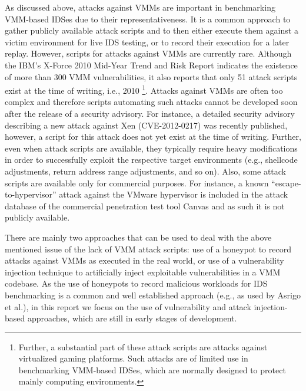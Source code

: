 As discussed above, attacks against VMMs are important in benchmarking VMM-based IDSes due to their representativeness. It is a common approach to gather publicly available attack scripts and to then either execute them against a victim environment for live IDS testing, or to record their execution for a later replay. However, scripts for attacks against VMMs are currently rare. Although the IBM's X-Force 2010 Mid-Year Trend and Risk Report indicates the existence of more than 300 VMM vulnerabilities, it also reports that only 51 attack scripts exist at the time of writing, i.e., 2010 \cite{ibm:midterm}\footnote{Further, a substantial part of these attack scripts are attacks against virtualized gaming platforms. Such attacks are of limited use in benchmarking VMM-based IDSes, which are normally designed to protect mainly computing environments.}. Attacks against VMMs are often too complex and therefore scripts automating such attacks cannot be developed soon after the release of a security advisory. For instance, a detailed security advisory describing a new attack against Xen (CVE-2012-0217) was recently published, however, a script for this attack does not yet exist at the time of writing. Further, even when attack scripts are available, they typically require heavy modifications in order to successfully exploit the respective target environments (e.g., shellcode adjustments, return address range adjustments, and so on). Also, some attack scripts are available only for commercial purposes. For instance, a known ``escape-to-hypervisor'' attack against the VMware hypervisor is included in the attack database of the commercial penetration test tool Canvas \cite{canvas} and as such it is not publicly available. 

There are mainly two approaches that can be used to deal with the above mentioned issue of the lack of VMM attack scripts: use of a honeypot to record attacks against VMMs as executed in the real world, or use of a vulnerability injection technique to artificially inject exploitable vulnerabilities in a VMM codebase. As the use of honeypots to record malicious workloads for IDS benchmarking is a common and well established approach (e.g., as used by Asrigo et al.\cite{asrigo:using}), in this report we focus on the use of vulnerability and attack injection-based approaches, which are still in early stages of development. 
 
